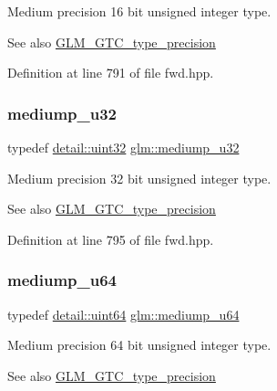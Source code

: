 Medium precision 16 bit unsigned integer type. \begin{DoxySeeAlso}{See also}
\mbox{\hyperlink{group__gtc__type__precision}{G\+L\+M\+\_\+\+G\+T\+C\+\_\+type\+\_\+precision}} 
\end{DoxySeeAlso}


Definition at line 791 of file fwd.\+hpp.

\mbox{\label{group__gtc__type__precision_gad0c27a525045c299a92306eb4cd7c13a}} 
\subsubsection{\texorpdfstring{mediump\_u32}{mediump\_u32}}
{\footnotesize\ttfamily typedef \mbox{\hyperlink{namespaceglm_1_1detail_ade6cfbf377022aaa391af8cd50489222}{detail\+::uint32}} \mbox{\hyperlink{group__gtc__type__precision_gad0c27a525045c299a92306eb4cd7c13a}{glm\+::mediump\+\_\+u32}}}

Medium precision 32 bit unsigned integer type. \begin{DoxySeeAlso}{See also}
\mbox{\hyperlink{group__gtc__type__precision}{G\+L\+M\+\_\+\+G\+T\+C\+\_\+type\+\_\+precision}} 
\end{DoxySeeAlso}


Definition at line 795 of file fwd.\+hpp.

\mbox{\label{group__gtc__type__precision_ga00c51a16fa190b0a90205d50d6d8a44a}} 
\subsubsection{\texorpdfstring{mediump\_u64}{mediump\_u64}}
{\footnotesize\ttfamily typedef \mbox{\hyperlink{namespaceglm_1_1detail_adec4b19bf4982125e122db2fe03c5810}{detail\+::uint64}} \mbox{\hyperlink{group__gtc__type__precision_ga00c51a16fa190b0a90205d50d6d8a44a}{glm\+::mediump\+\_\+u64}}}

Medium precision 64 bit unsigned integer type. \begin{DoxySeeAlso}{See also}
\mbox{\hyperlink{group__gtc__type__precision}{G\+L\+M\+\_\+\+G\+T\+C\+\_\+type\+\_\+precision}} 
\end{DoxySeeAlso}


